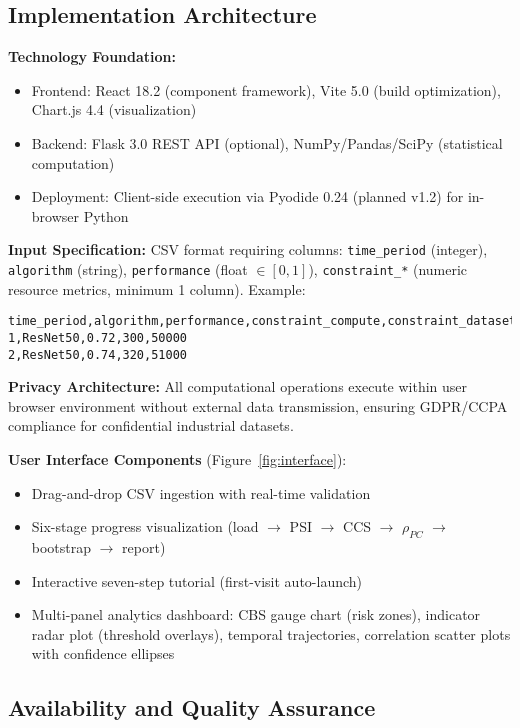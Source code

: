 \documentclass[10pt]{article}
\begin{document}
\subsection{Implementation Architecture}

\textbf{Technology Foundation:}
\begin{itemize}
    \item Frontend: React 18.2 (component framework), Vite 5.0 (build optimization), Chart.js 4.4 (visualization)
    \item Backend: Flask 3.0 REST API (optional), NumPy/Pandas/SciPy (statistical computation)
    \item Deployment: Client-side execution via Pyodide 0.24 (planned v1.2) for in-browser Python
\end{itemize}

\textbf{Input Specification:} CSV format requiring columns: \texttt{time\_period} (integer), \texttt{algorithm} (string), \texttt{performance} (float $\in [0,1]$), \texttt{constraint\_*} (numeric resource metrics, minimum 1 column). Example:
\begin{verbatim}
time_period,algorithm,performance,constraint_compute,constraint_dataset_size
1,ResNet50,0.72,300,50000
2,ResNet50,0.74,320,51000
\end{verbatim}

\textbf{Privacy Architecture:} All computational operations execute within user browser environment without external data transmission, ensuring GDPR/CCPA compliance for confidential industrial datasets.

\textbf{User Interface Components} (Figure~\ref{fig:interface}):
\begin{itemize}
    \item Drag-and-drop CSV ingestion with real-time validation
    \item Six-stage progress visualization (load $\rightarrow$ PSI $\rightarrow$ CCS $\rightarrow$ $\rho_{PC}$ $\rightarrow$ bootstrap $\rightarrow$ report)
    \item Interactive seven-step tutorial (first-visit auto-launch)
    \item Multi-panel analytics dashboard: CBS gauge chart (risk zones), indicator radar plot (threshold overlays), temporal trajectories, correlation scatter plots with confidence ellipses
\end{itemize}

\subsection{Availability and Quality Assurance}
\end{document}
